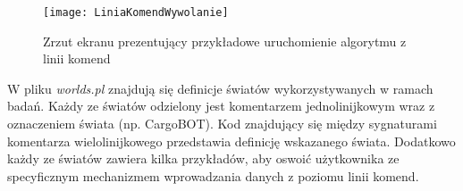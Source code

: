     \begin{figure}[H]
        \texttt{[image: LiniaKomendWywolanie]}
        \centering
        \caption{Zrzut ekranu prezentujący przykładowe uruchomienie algorytmu z linii komend}
    \end{figure}

    W pliku \textit{worlds.pl} znajdują się definicje światów wykorzystywanych w ramach badań. Każdy ze światów odzielony jest komentarzem 
    jednolinijkowym wraz z oznaczeniem świata (np. CargoBOT). Kod znajdujący się między sygnaturami komentarza wielolinijkowego przedstawia 
    definicję wskazanego świata.
    Dodatkowo każdy ze światów zawiera kilka przykładów, aby oswoić użytkownika ze specyficznym mechanizmem wprowadzania danych 
    z poziomu linii komend.

